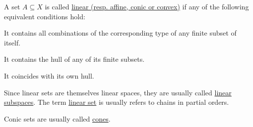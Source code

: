 \begin{definition}\label{def:analysis/linear_combination_sets}
  A set $A \subseteq X$ is called \uline{linear (resp. affine, conic or convex)} if any of the following equivalent conditions hold:

  \begin{defenum}
    \item It contains all combinations of the corresponding type of any finite subset of itself.
    \item It contains the hull of any of its finite subsets.
    \item It coincides with its own hull.
  \end{defenum}

  Since linear sets are themselves linear spaces, they are usually called \uline{linear subspaces}. The term \uline{linear set} is usually refers to chains in partial orders.

  Conic sets are usually called \uline{cones}.
\end{definition}

